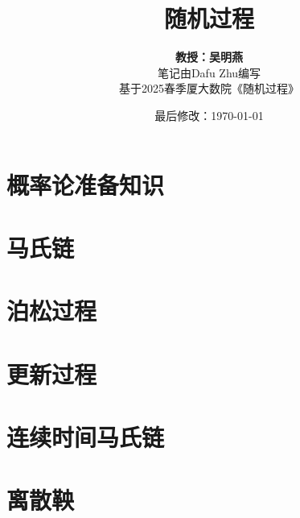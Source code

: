 \documentclass{article}
\title{随机过程}
\author{\textbf{教授：吴明燕} \\ 笔记由Dafu Zhu编写 \\ 基于2025春季厦大数院《随机过程》}
\date{最后修改：\today}
\begin{document}
\maketitle

\tableofcontents

\pagebreak

\section{概率论准备知识}







\pagebreak

\section{马氏链}










\pagebreak

\section{泊松过程}





\pagebreak

\section{更新过程}


\pagebreak

\section{连续时间马氏链}




\pagebreak

\section{离散鞅}



\pagebreak



\end{document}
